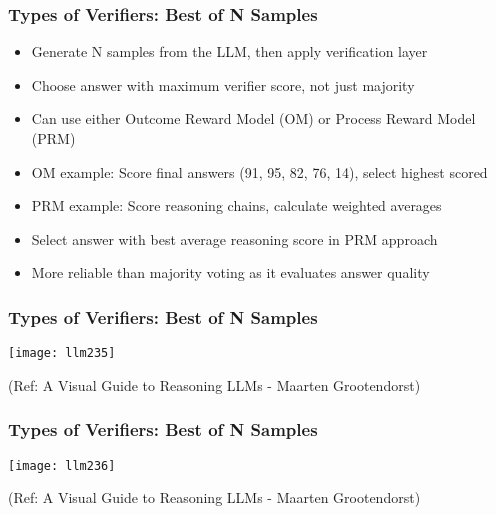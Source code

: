 \begin{frame}[fragile]\frametitle{Types of Verifiers: Best of N Samples}
      \begin{itemize}
        \item Generate N samples from the LLM, then apply verification layer
        \item Choose answer with maximum verifier score, not just majority
        \item Can use either Outcome Reward Model (OM) or Process Reward Model (PRM)
        \item OM example: Score final answers (91, 95, 82, 76, 14), select highest scored
        \item PRM example: Score reasoning chains, calculate weighted averages
        \item Select answer with best average reasoning score in PRM approach
        \item More reliable than majority voting as it evaluates answer quality
      \end{itemize}
	  
	  
		
\end{frame}

\begin{frame}[fragile]\frametitle{Types of Verifiers: Best of N Samples}
	  
	
		\begin{center}
        \texttt{[image: llm235]}
		
	
		{\tiny (Ref: A Visual Guide to Reasoning LLMs - Maarten Grootendorst)}
		
		\end{center}			
\end{frame}

\begin{frame}[fragile]\frametitle{Types of Verifiers: Best of N Samples}

		\begin{center}
		
        \texttt{[image: llm236]}
		
		{\tiny (Ref: A Visual Guide to Reasoning LLMs - Maarten Grootendorst)}
		
		\end{center}			
\end{frame}


